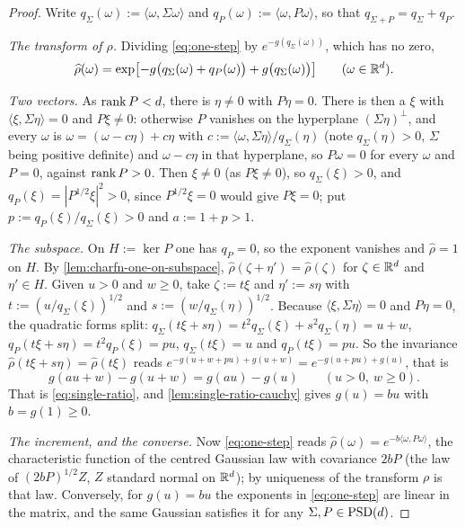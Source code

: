 \begin{proof}
\leanok
Write $q_\Sigma(\omega) := \langle\omega,\Sigma\omega\rangle$ and
$q_P(\omega) := \langle\omega,P\omega\rangle$, so that $q_{\Sigma+P} = q_\Sigma + q_P$.

\emph{The transform of $\rho$.} Dividing \ref{eq:one-step} by
$e^{-g(q_\Sigma(\omega))}$, which has no zero,
\[
  \widehat\rho(\omega) = \exp\bigl[-g\bigl(q_\Sigma(\omega) + q_P(\omega)\bigr)
     + g\bigl(q_\Sigma(\omega)\bigr)\bigr] \qquad (\omega \in \mathbb{R}^d).
\]

\emph{Two vectors.} As $\operatorname{rank} P < d$, there is $\eta \ne 0$ with $P\eta = 0$. There is then a
$\xi$ with $\langle\xi,\Sigma\eta\rangle = 0$ and $P\xi \ne 0$: otherwise $P$ vanishes on the
hyperplane $(\Sigma\eta)^\perp$, and every $\omega$ is
$\omega = (\omega - c\eta) + c\eta$ with $c := \langle\omega,\Sigma\eta\rangle/q_\Sigma(\eta)$
(note $q_\Sigma(\eta) > 0$, $\Sigma$ being positive definite) and $\omega - c\eta$ in that
hyperplane, so $P\omega = 0$ for every $\omega$ and $P = 0$, against $\operatorname{rank} P > 0$. Then
$\xi \ne 0$ (as $P\xi \ne 0$), so $q_\Sigma(\xi) > 0$, and $q_P(\xi) = |P^{1/2}\xi|^2 > 0$, since
$P^{1/2}\xi = 0$ would give $P\xi = 0$; put $p := q_P(\xi)/q_\Sigma(\xi) > 0$ and $a := 1 + p > 1$.

\emph{The subspace.} On $H := \ker P$ one has $q_P = 0$, so the exponent vanishes and
$\widehat\rho = 1$ on $H$. By \ref{lem:charfn-one-on-subspace},
$\widehat\rho(\zeta + \eta') = \widehat\rho(\zeta)$ for $\zeta \in \mathbb{R}^d$ and $\eta' \in H$. Given
$u > 0$ and $w \ge 0$, take $\zeta := t\xi$ and $\eta' := s\eta$ with
$t := (u/q_\Sigma(\xi))^{1/2}$ and $s := (w/q_\Sigma(\eta))^{1/2}$. Because
$\langle\xi,\Sigma\eta\rangle = 0$ and $P\eta = 0$, the quadratic forms split:
$q_\Sigma(t\xi + s\eta) = t^2q_\Sigma(\xi) + s^2q_\Sigma(\eta) = u + w$,
$q_P(t\xi + s\eta) = t^2q_P(\xi) = pu$, $q_\Sigma(t\xi) = u$ and $q_P(t\xi) = pu$. So the
invariance $\widehat\rho(t\xi + s\eta) = \widehat\rho(t\xi)$ reads
$e^{-g(u + w + pu) + g(u + w)} = e^{-g(u + pu) + g(u)}$, that is
\[
  g(au + w) - g(u + w) = g(au) - g(u) \qquad (u > 0,\ w \ge 0).
\]
That is \ref{eq:single-ratio}, and \ref{lem:single-ratio-cauchy} gives $g(u) = bu$ with
$b = g(1) \ge 0$.

\emph{The increment, and the converse.} Now \ref{eq:one-step} reads
$\widehat\rho(\omega) = e^{-b\langle\omega,P\omega\rangle}$, the characteristic function of the
centred Gaussian law with covariance $2bP$ (the law of $(2bP)^{1/2}Z$, $Z$ standard normal on
$\mathbb{R}^d$); by uniqueness of the transform $\rho$ is that law. Conversely, for $g(u) = bu$ the
exponents in \ref{eq:one-step} are linear in the matrix, and the same Gaussian satisfies it for any
$\Sigma, P \in \mathrm{PSD}(d)$.
\end{proof}

